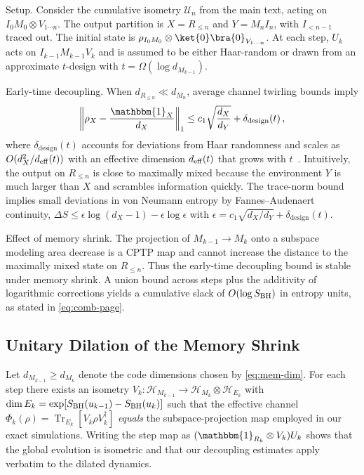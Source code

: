 \documentclass[11pt,a4paper]{article}
\newcommand{\Tr}{\operatorname{Tr}}
\theoremstyle{plain}
\theoremstyle{definition}
\theoremstyle{remark}
\begin{document}
Setup. Consider the cumulative isometry $\mathcal{U}_n$ from the main text, acting on $I_0 M_0 \otimes V_{1\cdots n}$. The output partition is $X=R_{\le n}$ and $Y=M_n I_n$, with $I_{<n-1}$ traced out. The initial state is $\rho_{I_0M_0}\otimes \ket{0}\bra{0}_{V_{1\cdots n}}$. At each step, $U_k$ acts on $I_{k-1}M_{k-1}V_k$ and is assumed to be either Haar-random or drawn from an approximate $t$-design with $t=\Omega(\log d_{M_{k-1}})$.

Early-time decoupling. When $d_{R_{\le n}}\ll d_{M_n}$, average channel twirling bounds imply 
\begin{equation}
\left\|\rho_{X} - \frac{\mathbbm{1}_X}{d_X}\right\|_1 \le c_1 \sqrt{\frac{d_X}{d_Y}} + \delta_{\text{design}}(t)\,,
\end{equation}
where $\delta_{\text{design}}(t)$ accounts for deviations from Haar randomness and scales as $O(d_X^2/d_{\rm eff}(t))$ with an effective dimension $d_{\rm eff}(t)$ that grows with $t$~\cite{Brandao:2016}. Intuitively, the output on $R_{\le n}$ is close to maximally mixed because the environment $Y$ is much larger than $X$ and scrambles information quickly. The trace-norm bound implies small deviations in von Neumann entropy by Fannes--Audenaert continuity, $\Delta S \le \epsilon \log (d_X-1)-\epsilon \log \epsilon$ with $\epsilon=c_1\sqrt{d_X/d_Y}+\delta_{\text{design}}(t)$.

Effect of memory shrink. The projection of $M_{k-1}\to M_k$ onto a subspace modeling area decrease is a CPTP map and cannot increase the distance to the maximally mixed state on $R_{\le n}$. Thus the early-time decoupling bound is stable under memory shrink. A union bound across steps plus the additivity of logarithmic corrections yields a cumulative slack of $O(\log S_{\rm BH})$ in entropy units, as stated in \eqref{eq:comb-page}.

\subsection{Unitary Dilation of the Memory Shrink}
Let $d_{M_{k-1}}\ge d_{M_k}$ denote the code dimensions chosen by \eqref{eq:mem-dim}. For each step there exists an isometry $V_k:\mathcal{H}_{M_{k-1}}\to\mathcal{H}_{M_k}\otimes\mathcal{H}_{E_k}$ with $\dim E_k=\exp\!\left[S_{\rm BH}(u_{k-1})-S_{\rm BH}(u_k)\right]$ such that the effective channel $\Phi_k(\rho)=\Tr_{E_k}[V_k \rho V_k^\dagger]$ \emph{equals} the subspace-projection map employed in our exact simulations. Writing the step map as $(\mathbbm{1}_{R_k}\otimes V_k)U_k$ shows that the global evolution is isometric and that our decoupling estimates apply verbatim to the dilated dynamics.
\end{document}
